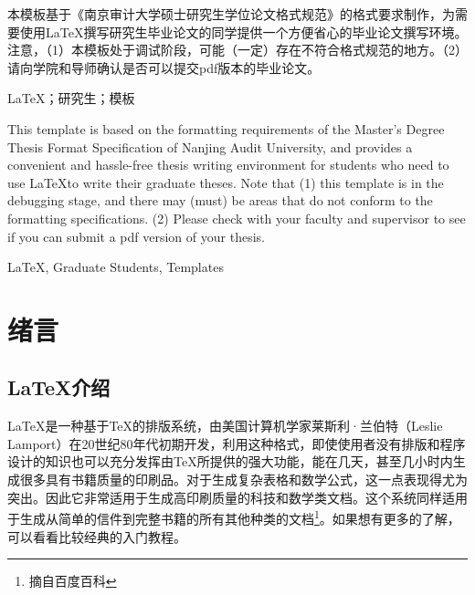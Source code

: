 \documentclass{NauThesis}
\begin{document}
\Statement

\begin{ZhAbstract}
    本模板基于《南京审计大学硕士研究生学位论文格式规范》的格式要求制作，为需要使用\LaTeX 撰写研究生毕业论文的同学提供一个方便省心的毕业论文撰写环境。注意，（1）本模板处于调试阶段，可能（一定）存在不符合格式规范的地方。（2）请向学院和导师确认是否可以提交pdf版本的毕业论文。

    \ZhKeywords \LaTeX；研究生；模板
\end{ZhAbstract}

\begin{EnAbstract}
    This template is based on the formatting requirements of the Master's Degree Thesis Format Specification of Nanjing Audit University, and provides a convenient and hassle-free thesis writing environment for students who need to use \LaTeX to write their graduate theses. Note that (1) this template is in the debugging stage, and there may (must) be areas that do not conform to the formatting specifications. (2) Please check with your faculty and supervisor to see if you can submit a pdf version of your thesis.

    \EnKeywords \LaTeX, Graduate Students, Templates
\end{EnAbstract}


\TableOfContents
\mainpagestyle
\setcounter{page}{1}

\chapter{绪言}

\section{\LaTeX 介绍}

\LaTeX 是一种基于\TeX 的排版系统，由美国计算机学家莱斯利·兰伯特（Leslie Lamport）在20世纪80年代初期开发，利用这种格式，即使使用者没有排版和程序设计的知识也可以充分发挥由\TeX 所提供的强大功能，能在几天，甚至几小时内生成很多具有书籍质量的印刷品。对于生成复杂表格和数学公式，这一点表现得尤为突出。因此它非常适用于生成高印刷质量的科技和数学类文档。这个系统同样适用于生成从简单的信件到完整书籍的所有其他种类的文档\footnote{摘自百度百科}。如果想有更多的了解，可以看看比较经典的入门教程。
\end{document}
